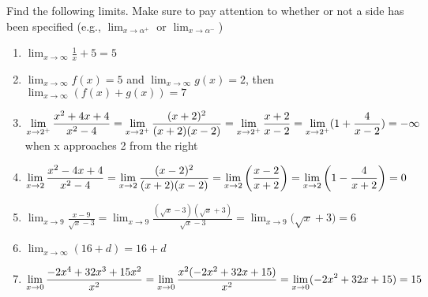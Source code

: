 \documentclass [12pt] {article}
\begin{document}
\bigskip
Find the following limits. Make sure to pay attention to whether or not a side has been specified (e.g., $\lim_{x \to \alpha^+} $ or $\lim_{x \to \alpha^-} $)
\begin{enumerate}
    \item $\displaystyle \lim_{x \to \infty} \frac{1}{x} +5 = 5 $
    \item $\lim_{x \to \infty} f(x) = 5$ and $\lim_{x \to \infty} g(x) = 2$, then $\lim_{x \to \infty} (f(x) +g(x))= 7$ 
    \item $ \displaystyle \lim_{x \to 2^+} { \frac{x^2+4x+4}{x^2-4}} \\ =\lim_{x \to 2^+} { \frac{(x+2)^2}{(x+2)(x-2)}} \\ =\lim_{x \to 2^+} { \frac{x+2}{x-2}} \\ =\lim_{x \to 2^+} (1 + { \frac{4}{x-2}}) \\ = -\infty $ when x approaches 2 from the right
    \item $ \displaystyle \lim_{x \to 2} { \frac{x^2-4x+4}{x^2-4}} \\ = \lim_{x \to 2} { \frac{(x-2)^2}{(x+2)(x-2)}} \\ = \lim_{x \to 2} \bigg( { \frac{x-2}{x+2}}\bigg) \\ = \lim_{x \to 2} \bigg(1 - {\displaystyle \frac{4}{x+2}} \bigg) \\ = 0$
    \item $ \displaystyle \lim_{x \to 9}{ \frac{x-9}{\sqrt{x}-3}} = \lim_{x \to 9}{ \frac{(\sqrt{x}-3)(\sqrt{x}+3)}{\sqrt{x}-3}}  =  \lim_{x \to 9}\bigg(\sqrt{x}+3\bigg) = 6$
    \item $ \lim_{x \to \infty} (16+d) = 16+d$
    \item $ \displaystyle \lim_{x \to 0} { \frac{-2x^4+32x^3 + 15x^2}{x^2} } \\=  \lim_{x \to 0} {\displaystyle \frac{x^2 (-2x^2+32x+15)}{x^2} } \\ =  \lim_{x \to 0}(-2x^2+32x+15) \\ = 15$
\end{enumerate}
\end{document}
